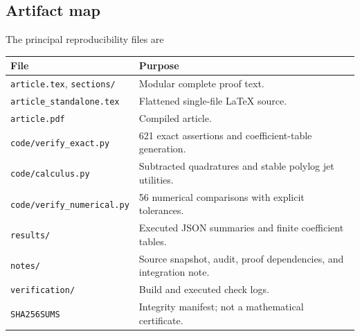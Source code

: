 \documentclass[11pt]{article}
\numberwithin{equation}{section}
\theoremstyle{definition}\newtheorem{definition}[theorem]{Definition}
\theoremstyle{remark}\newtheorem{remark}[theorem]{Remark}
\newcommand{\src}[1]{\nolinkurl{#1}}
\begin{document}
\subsection{Artifact map}
The principal reproducibility files are
\begin{center}
\begin{tabular}{p{}p{}}
\toprule
File & Purpose\\\midrule
\src{article.tex}, \src{sections/} & Modular complete proof text.\\
\src{article_standalone.tex} & Flattened single-file LaTeX source.\\
\src{article.pdf} & Compiled article.\\
\src{code/verify_exact.py} & 621 exact assertions and coefficient-table generation.\\
\src{code/calculus.py} & Subtracted quadratures and stable polylog jet utilities.\\
\src{code/verify_numerical.py} & 56 numerical comparisons with explicit tolerances.\\
\src{results/} & Executed JSON summaries and finite coefficient tables.\\
\src{notes/} & Source snapshot, audit, proof dependencies, and integration note.\\
\src{verification/} & Build and executed check logs.\\
\src{SHA256SUMS} & Integrity manifest; not a mathematical certificate.\\\bottomrule
\end{tabular}
\end{center}

\end{document}
